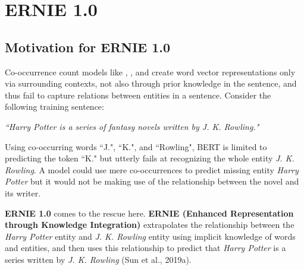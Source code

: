 \section{ERNIE 1.0} \label{sec:ERNIE_1}

\subsection{Motivation for ERNIE 1.0}

Co-occurrence count models like , , and  create word vector representations only via surrounding contexts, not also through prior knowledge in the sentence, and thus fail to capture relations between entities in a sentence. Consider the following training sentence: 

{\normalsize \textit{``Harry Potter is a series of fantasy novels written by J. K. Rowling."}}

Using co-occurring words ``J.", ``K.", and ``Rowling", BERT is limited to predicting the token ``K." but utterly fails at recognizing the whole entity \emph{J. K. Rowling}. A model could use mere co-occurrences to predict missing entity \emph{Harry Potter} but it would not be making use of the relationship between the novel and its writer. 

\textbf{ERNIE 1.0} comes to the rescue here. \textbf{ERNIE (Enhanced Representation through Knowledge Integration)} extrapolates the relationship between the \emph{Harry Potter} entity and \emph{J. K. Rowling} entity using implicit knowledge of words and entities, and then uses this relationship to predict that \emph{Harry Potter} is a series written by \emph{J. K. Rowling} (Sun et al., 2019a). 










